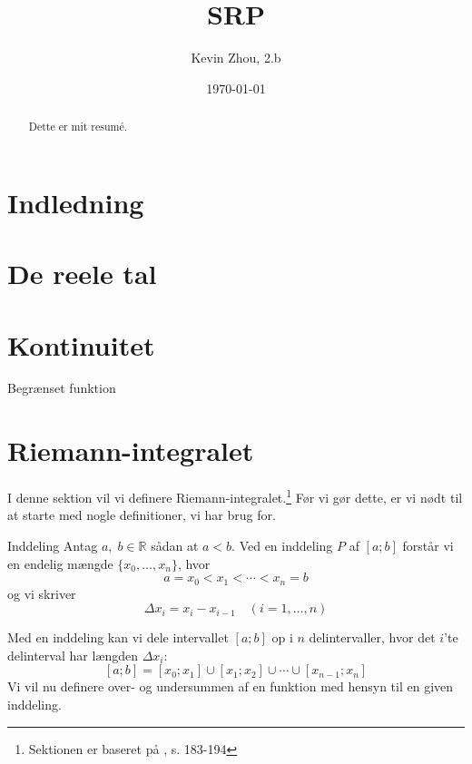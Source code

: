 \documentclass{article}
\title{SRP}
\author{Kevin Zhou, 2.b}
\date{\today}
\begin{document}

\begin{abstract}
  Dette er mit resumé.
\end{abstract}

\tableofcontents
\thispagestyle{empty}
\newpage
{}
\section{Indledning}
  \label{sec:Indledning}

\section{De reele tal}%
\label{sec:De reele tal}


\section{Kontinuitet}%
\label{sec:Kontinuitet}

\begin{definition}{Begrænset funktion}{}
  
\end{definition}
\section{Riemann-integralet}%
\label{sec:Riemann-integralet}
I denne sektion vil vi definere Riemann-integralet.\footnote{Sektionen er baseret på \cite{Abbott2002}, s. 183-194}
Før vi gør dette, er vi nødt til at starte med nogle definitioner, vi har brug for.
\begin{definition}{Inddeling}{}
  Antag $a,\;b \in \mathbb{R}$ sådan at $a <b$.
  Ved en inddeling $P$ af $[a;b]$ forstår vi en endelig mængde $\{x_0,\dotsc, x_n\}$, hvor
  \[
  a=x_0<x_1<\cdots<x_n=b
  \] 
  og vi skriver 
  \[
  \Delta x_i=x_i-x_{i-1} \quad (i=1,\ldots ,n)
  \]  
\end{definition}
Med en inddeling kan vi dele intervallet $[a;b]$ op i $n$ delintervaller, hvor det $i$'te delinterval har længden $\Delta x_i$:
\[
[a;b]=[x_0;x_1] \cup [x_1;x_2]\cup \cdots \cup [x _{n-1};x_n]
\] 
Vi vil nu definere over- og undersummen af en funktion med hensyn til en given inddeling.
\end{document}
